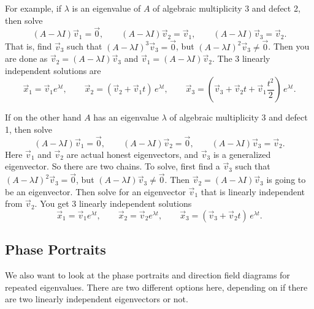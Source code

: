 \documentclass{ximera}
\begin{document}
For example, if $\lambda$ is an eigenvalue of $A$ of algebraic multiplicity 3 and defect 2, then solve
\begin{equation*}
    (A - \lambda I) \vec{v}_1 = \vec{0} , \qquad (A - \lambda I) \vec{v}_2 = \vec{v}_1 , \qquad (A - \lambda I) \vec{v}_3 = \vec{v}_2 .
\end{equation*}
That is, find $\vec{v}_3$ such that  ${(A - \lambda I)}^3 \vec{v}_3 = \vec{0}$, but ${(A - \lambda I)}^2 \vec{v}_3 \not= \vec{0}$. Then you are done as $\vec{v}_2 = (A - \lambda I) \vec{v}_3$ and $\vec{v}_1 = (A - \lambda I) \vec{v}_2$. The 3 linearly independent solutions are
\begin{equation*}
    \vec{x}_1 = \vec{v}_1 e^{\lambda t} , \qquad \vec{x}_2 = ( \vec{v}_2 + \vec{v}_1 t ) \, e^{\lambda t} , \qquad \vec{x}_3 = \left( \vec{v}_3 + \vec{v}_2 t + \vec{v}_{1} \frac{t^2}{2} \right) \, e^{\lambda t} .
\end{equation*}

If on the other hand $A$ has an eigenvalue $\lambda$ of algebraic multiplicity 3 and defect 1, then  solve
\begin{equation*}
    (A - \lambda I) \vec{v}_1 = \vec{0} , \qquad (A - \lambda I) \vec{v}_2 = \vec{0} , \qquad (A - \lambda I) \vec{v}_3 = \vec{v}_2 .
\end{equation*}
Here $\vec{v}_1$ and $\vec{v}_2$ are actual honest eigenvectors, and $\vec{v}_3$ is a generalized eigenvector. So there are two chains. To solve, first find a 
$\vec{v}_3$ such that ${(A - \lambda I)}^2 \vec{v}_3 = \vec{0}$, but $(A - \lambda I) \vec{v}_3 \not= \vec{0}$. Then $\vec{v}_2 = (A - \lambda I) \vec{v}_3$ is going to be an eigenvector. Then solve for an eigenvector $\vec{v}_1$ that is linearly independent  from $\vec{v}_2$. You get 3 linearly independent solutions
\begin{equation*}
    \vec{x}_1 = \vec{v}_1 e^{\lambda t} , \qquad \vec{x}_2 = \vec{v}_2 e^{\lambda t} , \qquad \vec{x}_3 = ( \vec{v}_3 + \vec{v}_2 t ) \, e^{\lambda t} .
\end{equation*}

\subsection{Phase Portraits}

We also want to look at the phase portraits and direction field diagrams for repeated eigenvalues. There are two different options here, depending on if there are two linearly independent eigenvectors or not.
\end{document}
